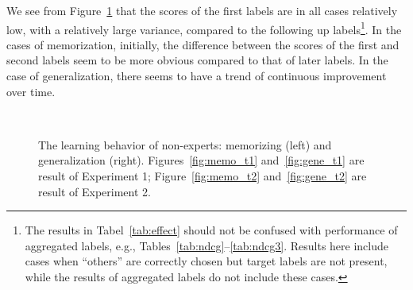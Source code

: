 %
We see from Figure~\ref{fig:learn} that the scores of the first labels are in all cases relatively 
low, with a relatively large variance, compared to the following up labels\footnote{The results in Tabel~\ref{tab:effect}
should not be confused with performance of aggregated labels, e.g., Tables~\ref{tab:ndcg}--\ref{tab:ndcg3}.
Results here include cases when ``others'' are correctly chosen but target labels are not present, while the results
of aggregated labels do not include these cases.}. 
In the cases of memorization, initially, the difference between the scores of the first and second labels 
seem to be more obvious compared to that of later labels. In the case of generalization, there seems to have 
a trend of continuous improvement over time.  
%
\begin{figure}[t!]
\\
\caption{The learning behavior of non-experts: memorizing (left) 
and generalization (right). Figures~\ref{fig:memo_t1} and~\ref{fig:gene_t1} are result of Experiment 1;
Figure~\ref{fig:memo_t2} and~\ref{fig:gene_t2} are result of Experiment 2.}
\label{fig:learn}
\end{figure}
